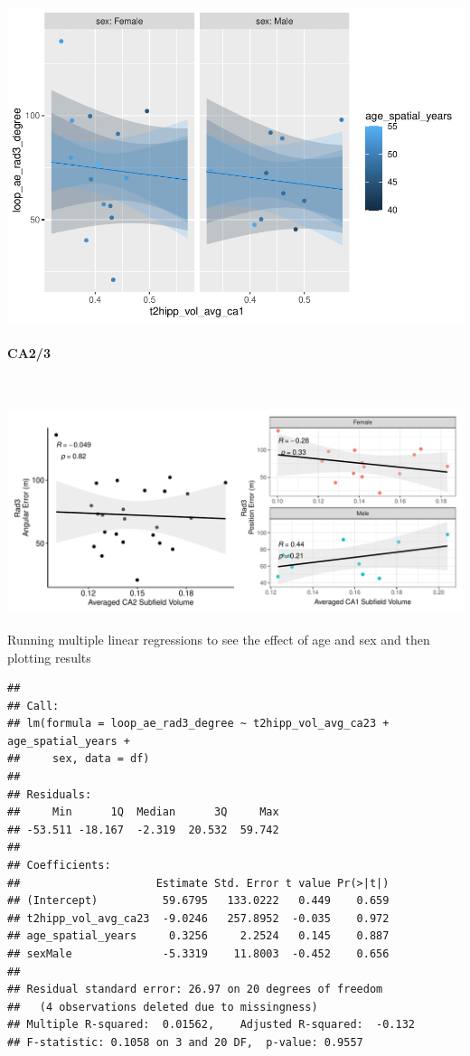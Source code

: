 \documentclass[
]{article}
\begin{document}
\includegraphics{hippocampal_subfield_files/figure-latex/Avg CA1 + rad3 angular errorMLR-1.pdf}
\vspace{1cm}

\paragraph{CA2/3}

~ \vspace{1cm}

\includegraphics{hippocampal_subfield_files/figure-latex/unnamed-chunk-9-1.pdf}

\vspace{1cm}

Running multiple linear regressions to see the effect of age and sex and
then plotting results

\begin{verbatim}
## 
## Call:
## lm(formula = loop_ae_rad3_degree ~ t2hipp_vol_avg_ca23 + age_spatial_years + 
##     sex, data = df)
## 
## Residuals:
##     Min      1Q  Median      3Q     Max 
## -53.511 -18.167  -2.319  20.532  59.742 
## 
## Coefficients:
##                     Estimate Std. Error t value Pr(>|t|)
## (Intercept)          59.6795   133.0222   0.449    0.659
## t2hipp_vol_avg_ca23  -9.0246   257.8952  -0.035    0.972
## age_spatial_years     0.3256     2.2524   0.145    0.887
## sexMale              -5.3319    11.8003  -0.452    0.656
## 
## Residual standard error: 26.97 on 20 degrees of freedom
##   (4 observations deleted due to missingness)
## Multiple R-squared:  0.01562,    Adjusted R-squared:  -0.132 
## F-statistic: 0.1058 on 3 and 20 DF,  p-value: 0.9557
\end{verbatim}
\end{document}
